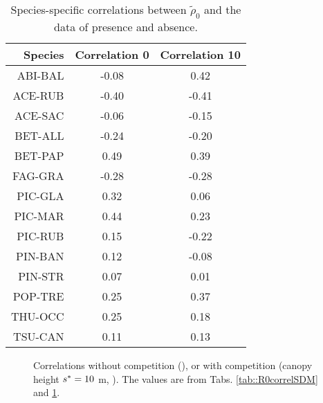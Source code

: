 \begin{refsection}
\begin{table}[ht]
\centering
\caption{Species-specific correlations between $ \tilde \rho_0 $ and the data of presence and absence. \label{tab::corr_R0_presAbsData}}
\begin{tabular}{rcc}
	\toprule
	\textbf{Species} & \textbf{Correlation 0} & \textbf{Correlation 10} \\
	\midrule
		ABI-BAL & -0.08 & 0.42 \\
		ACE-RUB & -0.40 & -0.41 \\
		ACE-SAC & -0.06 & -0.15 \\
		BET-ALL & -0.24 & -0.20 \\
		BET-PAP & 0.49 & 0.39 \\
		FAG-GRA & -0.28 & -0.28 \\
		PIC-GLA & 0.32 & 0.06 \\
		PIC-MAR & 0.44 & 0.23 \\
		PIC-RUB & 0.15 & -0.22 \\
		PIN-BAN & 0.12 & -0.08 \\
		PIN-STR & 0.07 & 0.01 \\
		POP-TRE & 0.25 & 0.37 \\
		THU-OCC & 0.25 & 0.18 \\
		TSU-CAN & 0.11 & 0.13 \\
 	\bottomrule
\end{tabular}
\end{table}

\begin{figure}
	\centering
	
	\caption{Correlations without competition (\MoveUp), or with competition (canopy height $ {s}^{*} = 10 $ m, \CircSteel). The values are from Tabs. \ref{tab::R0correlSDM} and \ref{tab::corr_R0_presAbsData}. \label{fig::correl_rf_vs_presAbs}}
\end{figure}


\end{refsection}
